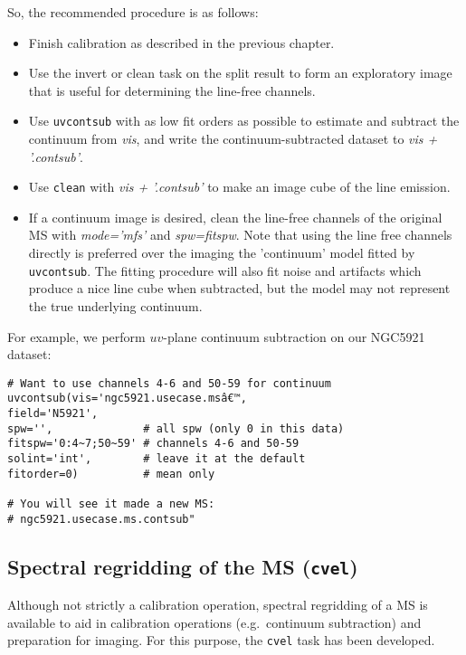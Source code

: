 So, the recommended procedure is as follows:
\begin{itemize}
\item Finish calibration as described in the previous chapter.
\item Use the invert or clean task on the split result to form an exploratory
  image that is useful for determining the line-free channels.
\item Use {\tt uvcontsub} with as low fit orders as possible to estimate and subtract the
  continuum from {\it vis}, and write the continuum-subtracted dataset
  to {\it vis + '.contsub'}.
\item Use {\tt clean} with {\it vis + '.contsub'} to make an image cube of the line emission.
\item If a continuum image is desired, clean the line-free channels of the
  original MS with {\it mode='mfs'} and {\it spw=fitspw}. Note that
  using the line free channels directly is preferred over the imaging
  the 'continuum' model fitted by {\tt uvcontsub}. The fitting
  procedure will also fit noise and artifacts which produce a nice
  line cube when subtracted, but the model may not represent the true
  underlying continuum.   
\end{itemize}

For example, we perform $uv$-plane continuum subtraction on our NGC5921
dataset:
\small
\begin{verbatim}
# Want to use channels 4-6 and 50-59 for continuum
uvcontsub(vis='ngc5921.usecase.msâ€™,
field='N5921',
spw='',              # all spw (only 0 in this data)
fitspw='0:4~7;50~59' # channels 4-6 and 50-59
solint='int',        # leave it at the default
fitorder=0)          # mean only

# You will see it made a new MS:
# ngc5921.usecase.ms.contsub"
\end{verbatim}
\normalsize

\subsection{Spectral regridding of the MS ({\tt cvel})}
\label{section:cal.other.cvel}

Although not strictly a calibration operation, spectral regridding
of a MS is available to aid in calibration operations (e.g.\ continuum
subtraction) and preparation for imaging.  For this purpose, the
{\tt cvel} task has been developed.  


